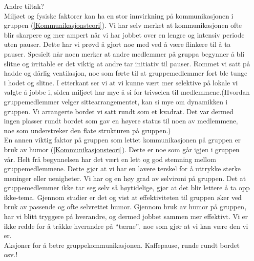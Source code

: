 Andre tiltak?\\

Miljøet og fysiske faktorer kan ha en stor innvirkning på kommunikasjonen i gruppen (\ref{Kommunikasjonsteori}). Vi har selv
merket at kommunikasjonen ofte blir skarpere og mer ampert når vi har jobbet over en lengre og
intensiv periode uten pauser. Dette har vi prøvd å gjort noe med ved å være flinkere til å ta
pauser. Spesielt når noen merker at andre medlemmer på gruppa begynner å bli slitne og irritable
er det viktig at andre tar initiativ til pauser. Rommet vi satt på hadde og dårlig ventilasjon,
noe som førte til at gruppemedlemmer fort ble tunge i hodet og slitne. I etterkant ser vi at
vi kunne vært mer selektive på lokale vi valgte å jobbe i, siden miljøet har mye å si for 
trivselen til medlemmene.(Hvordan gruppemedlemmer velger sittearrangementet, kan si mye om 
dynamikken i gruppen. Vi arrangerte bordet vi satt rundt som et kvadrat. Det var dermed ingen
plasser rundt bordet som gav en høyere status til noen av medlemmene, noe som understreker den 
flate strukturen på gruppen.)\\

En annen viktig faktor på gruppen som lettet kommunikasjonen på gruppen er bruk av humor (\ref{Kommunikasjonsteori}). Dette er noe
som går igjen i gruppen vår. Helt frå begynnelsen har det vært en lett og god stemning mellom gruppemedlemmene. 
Dette gjør at vi har en lavere terskel for å uttrykke sterke meninger eller uenigheter. Vi har og en høy grad 
av selvironi på gruppen. Det at gruppemedlemmer ikke tar seg selv så høytidelige, gjør at det blir lettere å ta 
opp ikke-tema. Gjennom studier er det og vist at effektiviteten til gruppen øker ved bruk av passende og ofte 
selvrettet humor. Gjennom bruk av humor på gruppen, har vi blitt tryggere på hverandre, og dermed jobbet sammen 
mer effektivt. Vi er ikke redde for å tråkke hverandre på ``tærne'', noe som gjør at vi kan være den vi er. \\

Aksjoner for å betre gruppekommunikasjonen. Kaffepause, runde rundt bordet osv.!\\

